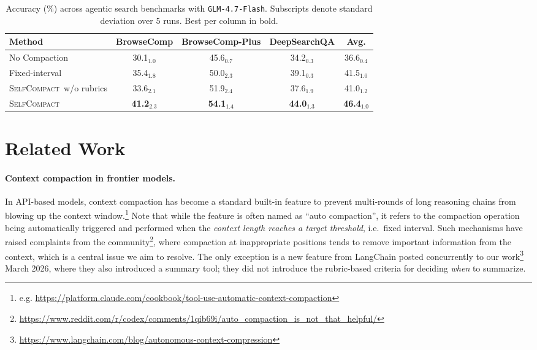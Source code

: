 \documentclass{article}
\newcommand{\method}{\textsc{{SelfCompact}}}
\newcommand{\daniel}[1]{\textcolor{orange!70!black}{[Daniel: #1]}}
\begin{document}
\begin{table}[t]
\centering
\caption{Accuracy (\%) across agentic search benchmarks with \texttt{GLM-4.7-Flash}. Subscripts denote standard deviation over 5 runs. Best per column in bold.}
\label{tab:selfcompact-glm}
\begin{tabular}{lcccc}
\toprule
Method & \textbf{BrowseComp} & \textbf{BrowseComp-Plus} & \textbf{DeepSearchQA} & \textbf{Avg.} \\
\midrule
No Compaction           & 30.1$_{1.0}$ & 45.6$_{0.7}$ & 34.2$_{0.3}$ & 36.6$_{0.4}$ \\
Fixed-interval          & 35.4$_{1.8}$ & 50.0$_{2.3}$ & 39.1$_{0.3}$ & 41.5$_{1.0}$ \\
\method~w/o rubrics & 33.6$_{2.1}$ & 51.9$_{2.4}$ & 37.6$_{1.9}$ & 41.0$_{1.2}$ \\ \midrule
\method          & \textbf{41.2}$_{2.3}$ & \textbf{54.1}$_{1.4}$ & \textbf{44.0}$_{1.3}$ & \textbf{46.4}$_{1.0}$ \\
\bottomrule
\end{tabular}
\end{table}


\section{Related Work}


\paragraph{Context compaction in frontier models.} In API-based models, context compaction has become a standard built-in feature to prevent multi-rounds of long reasoning chains from blowing up the context window.\footnote{e.g. \url{https://platform.claude.com/cookbook/tool-use-automatic-context-compaction}}
Note that while the feature is often named as ``auto compaction'', it refers to the compaction operation being automatically triggered and performed when the \emph{context length reaches a target threshold}, i.e.\ fixed interval.
Such mechanisms have raised complaints from the community\footnote{\url{https://www.reddit.com/r/codex/comments/1qib69i/auto_compaction_is_not_that_helpful/}}, where compaction at inappropriate positions tends to remove important information from the context, which is a central issue we aim to resolve.
The only exception is a new feature from LangChain posted concurrently to our work\footnote{\url{https://www.langchain.com/blog/autonomous-context-compression}} March 2026, where they also introduced a summary tool; they did not introduce the rubric-based criteria for deciding \textit{when} to summarize.
\end{document}
